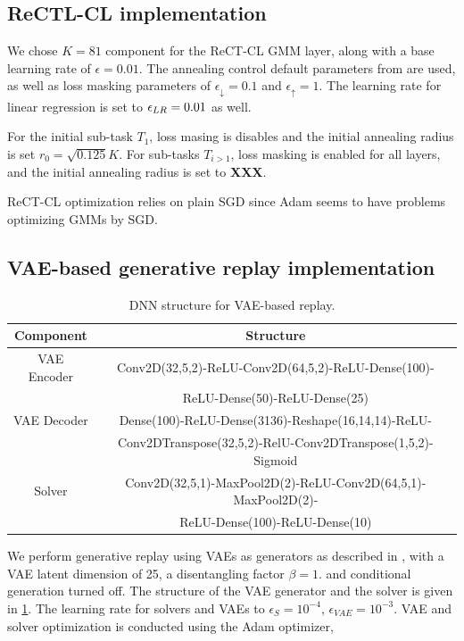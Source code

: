 \documentclass{article} %
\begin{document}
\subsection{ReCTL-CL implementation}
% 
We chose $K=81$ component for the ReCT-CL GMM layer, along with a base learning rate of $\epsilon=0.01$. The annealing control default parameters from \cite{sgdgmm} are used, as well as loss masking parameters of $\epsilon_\downarrow = 0.1$ and $\epsilon_\uparrow=1$. The learning rate for linear regression is set to ${\epsilon}_{LR}=0.01$ as well.

For the initial sub-task $T_1$, loss masing is disables and the initial annealing radius is set $r_0=\sqrt{0.125} K$.
For sub-tasks $T_{i>1}$, loss masking is enabled for all layers, and the initial annealing radius is set to \textbf{XXX}.

ReCT-CL optimization relies on plain SGD since Adam seems to have problems optimizing GMMs by SGD. 

%
\subsection{VAE-based generative replay implementation}
%
\begin{table}
\caption{DNN structure for VAE-based replay.
\label{tab:networkstructure}
}
\centering
\tiny
\begin{tabular}{|c|c|}
\hline
\textbf{Component}    &  \textbf{Structure}  \\
\hline
VAE Encoder  & Conv2D(32,5,2)-ReLU-Conv2D(64,5,2)-ReLU-Dense(100)-\\
               &  ReLU-Dense(50)-ReLU-Dense(25) \\
VAE Decoder & Dense(100)-ReLU-Dense(3136)-Reshape(16,14,14)-ReLU-\\
            & Conv2DTranspose(32,5,2)-RelU-Conv2DTranspose(1,5,2)-Sigmoid \\
Solver      & Conv2D(32,5,1)-MaxPool2D(2)-ReLU-Conv2D(64,5,1)-MaxPool2D(2)- \\      
            & ReLU-Dense(100)-ReLU-Dense(10)\\
\hline
\end{tabular}
\end{table}
%
%
We perform generative replay using VAEs as generators as described in \cite{nadz22}, 
with a VAE latent dimension of 25, a disentangling factor $\beta=1.$ and conditional generation turned off.
The structure of the VAE generator and the solver is given in \cref{tab:networkstructure}.
%
The learning rate for solvers and VAEs to $\epsilon_S=10^{-4}$, $\epsilon_{VAE}=10^{-3}$.
VAE and solver optimization is conducted using the Adam optimizer, 
%
\end{document}
